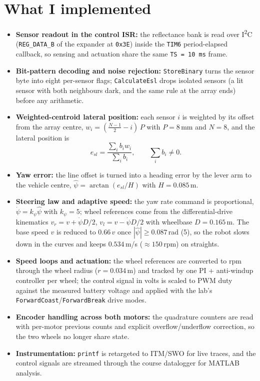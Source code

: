 \documentclass[10pt,a4paper]{article}
\begin{document}
\section*{What I implemented}
\begin{itemize}
  \item \textbf{Sensor readout in the control ISR:} the reflectance bank is read over
        I\textsuperscript{2}C (\texttt{REG\_DATA\_B} of the expander at \texttt{0x3E}) inside the
        \texttt{TIM6} period-elapsed callback, so sensing and actuation share the same \texttt{TS = 10\,ms} frame.
  \item \textbf{Bit-pattern decoding and noise rejection:} \texttt{StoreBinary} turns the sensor byte into eight
        per-sensor flags; \texttt{CalculateEsl} drops isolated sensors (a lit sensor with both neighbours dark,
        and the same rule at the array ends) before any arithmetic.
  \item \textbf{Weighted-centroid lateral position:} each sensor $i$ is weighted by its offset from the array
        centre, $w_i = (\tfrac{N-1}{2}-i)\,P$ with $P=8$\,mm and $N=8$, and the lateral position is
        \[ e_{sl}=\frac{\sum_i b_i w_i}{\sum_i b_i}, \qquad \textstyle\sum_i b_i \neq 0. \]
  \item \textbf{Yaw error:} the line offset is turned into a heading error by the lever arm to the vehicle centre,
        $\hat\psi=\arctan\!\left(e_{sl}/H\right)$ with $H=0.085$\,m.
  \item \textbf{Steering law and adaptive speed:} the yaw rate command is proportional,
        $\dot\psi = k_\psi \hat\psi$ with $k_\psi = 5$; wheel references come from the differential-drive
        kinematics $v_r = v + \dot\psi D/2$, $v_l = v - \dot\psi D/2$ with wheelbase $D=0.165$\,m. The base speed
        $v$ is reduced to $0.66\,v$ once $|\hat\psi| \ge 0.087$\,rad (5\textdegree{}), so the robot slows down in
        the curves and keeps $0.534$\,m/s ($\approx 150$\,rpm) on straights.
  \item \textbf{Speed loops and actuation:} the wheel references are converted to rpm through the wheel radius
        ($r = 0.034$\,m) and tracked by one PI + anti-windup controller per wheel; the control signal in volts is
        scaled to PWM duty against the measured battery voltage and applied with the lab's
        \texttt{ForwardCoast}/\texttt{ForwardBreak} drive modes.
  \item \textbf{Encoder handling across both motors:} the quadrature counters are read with per-motor previous
        counts and explicit overflow/underflow correction, so the two wheels no longer share state.
  \item \textbf{Instrumentation:} \texttt{printf} is retargeted to ITM/SWO for live traces, and the control
        signals are streamed through the course datalogger for MATLAB analysis.
\end{itemize}
\end{document}
